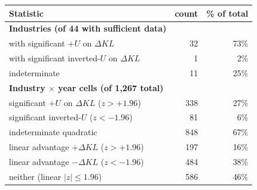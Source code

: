 \begin{tabular}{lrr}
\toprule
Statistic & count & \% of total \\
\midrule
\textbf{Industries (of 44 with sufficient data)} & & \\
  with significant $+U$ on $\Delta KL$ & 32 & 73\% \\
  with significant inverted-$U$ on $\Delta KL$ & 1 & 2\% \\
  indeterminate & 11 & 25\% \\
\midrule
\textbf{Industry $\times$ year cells (of 1,267 total)} & & \\
  significant $+U$ on $\Delta KL$ ($z > +1.96$) & 338 & 27\% \\
  significant inverted-$U$ ($z < -1.96$) & 81 & 6\% \\
  indeterminate quadratic & 848 & 67\% \\
  linear advantage $+\Delta KL$ ($z > +1.96$) & 197 & 16\% \\
  linear advantage $-\Delta KL$ ($z < -1.96$) & 484 & 38\% \\
  neither (linear $|z| \leq 1.96$) & 586 & 46\% \\
\bottomrule
\end{tabular}